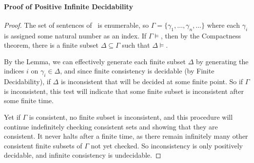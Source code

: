 \paragraph{Proof of Positive Infinite Decidability}

\begin{proof}
 	 The set of sentences of \lone\ is enumerable, so
 $\Gamma = \{\gamma_{1},\ldots,\gamma_{n},\ldots\}$ where each $\gamma_{i}$ is
assigned some natural number as an index. If $\Gamma \vDash$, then  
by the Compactness theorem,
there is a finite subset $\Delta \subseteq \Gamma$ such that $\Delta 
\vDash$. 

By the Lemma, we can effectively generate each finite subset
 $\Delta$  by
generating the indices $i$ on $\gamma_{i}\in\Delta$, and since finite consistency is decidable (by Finite Decidability), if $\Delta$ is
inconsistent that will be decided at some finite point. So if
$\Gamma$ is inconsistent, this test will indicate that some finite
subset is inconsistent after some finite time.

Yet if $\Gamma$ is consistent, no finite subset is inconsistent,
and this procedure will continue indefinitely checking consistent 
sets and showing that they are consistent. It never halts after a finite time,
as there remain infinitely many other consistent finite subsets of
$\Gamma$ not yet checked. So inconsistency is only positively decidable, and infinite consistency is undecidable.  \end{proof}


